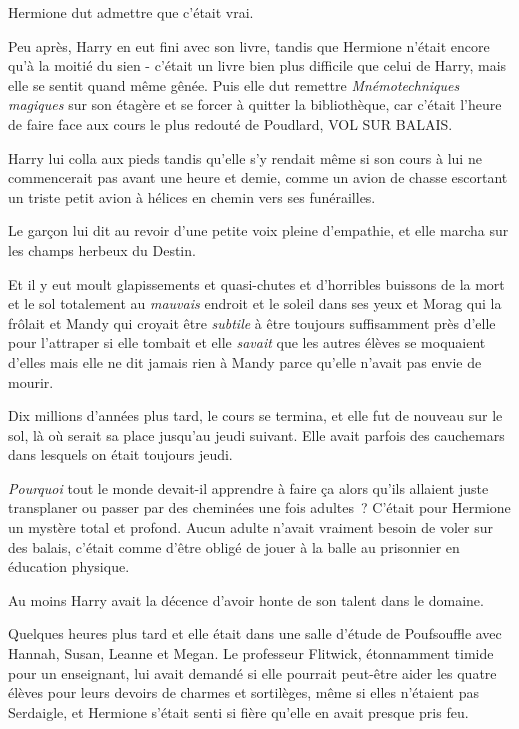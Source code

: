 Hermione dut admettre que c'était vrai.

Peu après, Harry en eut fini avec son livre, tandis que Hermione n'était encore qu'à la moitié du sien - c'était un livre bien plus difficile que celui de Harry, mais elle se sentit quand même gênée. Puis elle dut remettre \emph{Mnémotechniques magiques} sur son étagère et se forcer à quitter la bibliothèque, car c'était l'heure de faire face aux cours le plus redouté de Poudlard, VOL SUR BALAIS.

Harry lui colla aux pieds tandis qu'elle s'y rendait même si son cours à lui ne commencerait pas avant une heure et demie, comme un avion de chasse escortant un triste petit avion à hélices en chemin vers ses funérailles.

Le garçon lui dit au revoir d'une petite voix pleine d'empathie, et elle marcha sur les champs herbeux du Destin.

Et il y eut moult glapissements et quasi-chutes et d'horribles buissons de la mort et le sol totalement au \emph{mauvais} endroit et le soleil dans ses yeux et Morag qui la frôlait et Mandy qui croyait être \emph{subtile} à être toujours suffisamment près d'elle pour l'attraper si elle tombait et elle \emph{savait} que les autres élèves se moquaient d'elles mais elle ne dit jamais rien à Mandy parce qu'elle n'avait pas envie de mourir.

Dix millions d'années plus tard, le cours se termina, et elle fut de nouveau sur le sol, là où serait sa place jusqu'au jeudi suivant. Elle avait parfois des cauchemars dans lesquels on était toujours jeudi.

\emph{Pourquoi} tout le monde devait-il apprendre à faire ça alors qu'ils allaient juste transplaner ou passer par des cheminées une fois adultes~? C'était pour Hermione un mystère total et profond. Aucun adulte n'avait vraiment besoin de voler sur des balais, c'était comme d'être obligé de jouer à la balle au prisonnier en éducation physique.

Au moins Harry avait la décence d'avoir honte de son talent dans le domaine.

\later

Quelques heures plus tard et elle était dans une salle d'étude de Poufsouffle avec Hannah, Susan, Leanne et Megan. Le professeur Flitwick, étonnamment timide pour un enseignant, lui avait demandé si elle pourrait peut-être aider les quatre élèves pour leurs devoirs de charmes et sortilèges, même si elles n'étaient pas Serdaigle, et Hermione s'était senti si fière qu'elle en avait presque pris feu.

